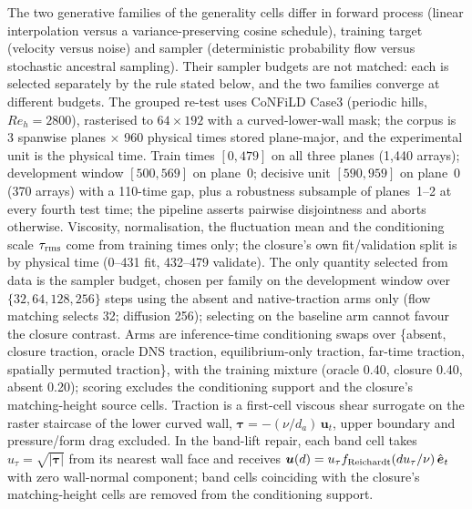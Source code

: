 The two generative families of the generality cells differ in forward process (linear
interpolation versus a variance-preserving cosine schedule), training target (velocity versus
noise) and sampler (deterministic probability flow versus stochastic ancestral sampling). Their
sampler budgets are not matched: each is selected separately by the rule stated below, and the
two families converge at different budgets.
The grouped re-test uses CoNFiLD Case3 (periodic hills, $Re_h=2800$), rasterised to $64\times192$
with a curved-lower-wall mask; the corpus is 3 spanwise planes $\times$ 960 physical times stored
plane-major, and the experimental unit is the physical time. Train times $[0,479]$ on all three
planes (1,440 arrays); development window $[500,569]$ on plane~0; decisive unit $[590,959]$ on
plane~0 (370 arrays) with a 110-time gap, plus a robustness subsample of planes~1--2 at every
fourth test time; the pipeline asserts pairwise disjointness and aborts otherwise. Viscosity,
normalisation, the
fluctuation mean and the conditioning scale $\tau_{\rm rms}$ come from training times only; the
closure's own fit/validation split is by physical time (0--431 fit, 432--479 validate). The only
quantity selected from data is the sampler budget, chosen per family on the development window
over $\{32,64,128,256\}$ steps using the absent and native-traction arms only (flow
matching selects 32; diffusion 256); selecting on the baseline arm cannot favour the closure
contrast. Arms are inference-time conditioning swaps over \{absent, closure traction, oracle DNS
traction, equilibrium-only traction, far-time traction, spatially permuted traction\}, with the
training mixture (oracle 0.40, closure 0.40, absent 0.20); scoring excludes the conditioning
support and the closure's matching-height source cells. Traction is a first-cell viscous shear
surrogate on the raster staircase of the lower curved wall,
$\boldsymbol{\tau}=-(\nu/d_a)\,\boldsymbol{u}_t$, upper boundary and pressure/form drag excluded.
In the band-lift repair, each band cell takes $u_\tau=\sqrt{|\boldsymbol{\tau}|}$ from its nearest
wall face and receives $\boldsymbol{u}(d)=u_\tau f_{\rm Reichardt}(d u_\tau/\nu)\,
\hat{\boldsymbol{e}}_t$ with zero wall-normal component; band cells coinciding with the closure's
matching-height cells are removed from the conditioning support.

